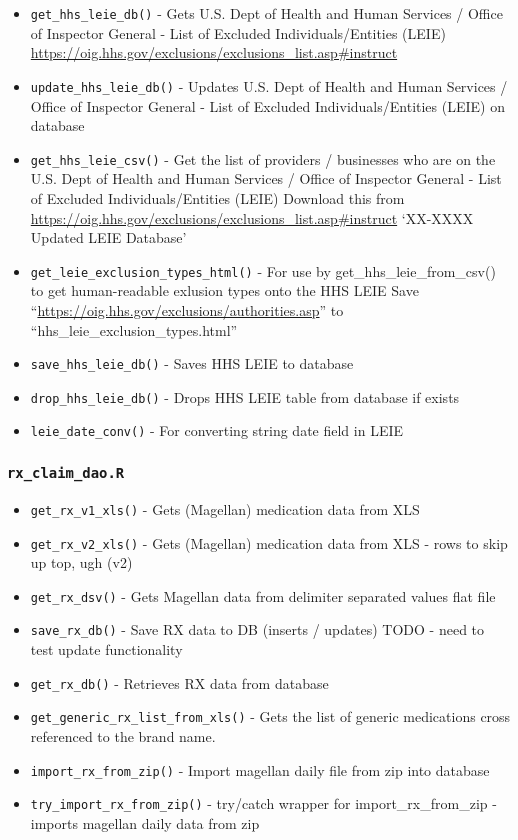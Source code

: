 \documentclass[
]{book}
\providecommand{\tightlist}{%
  \setlength{\itemsep}{0pt}\setlength{\parskip}{0pt}}
\begin{document}
\begin{itemize}
\tightlist
\item
  \texttt{get\_hhs\_leie\_db()} - Gets U.S. Dept of Health and Human Services / Office of Inspector General - List of Excluded Individuals/Entities (LEIE) \url{https://oig.hhs.gov/exclusions/exclusions_list.asp\#instruct}
\item
  \texttt{update\_hhs\_leie\_db()} - Updates U.S. Dept of Health and Human Services / Office of Inspector General - List of Excluded Individuals/Entities (LEIE) on database
\item
  \texttt{get\_hhs\_leie\_csv()} - Get the list of providers / businesses who are on the U.S. Dept of Health and Human Services / Office of Inspector General - List of Excluded Individuals/Entities (LEIE) Download this from \url{https://oig.hhs.gov/exclusions/exclusions_list.asp\#instruct} `XX-XXXX Updated LEIE Database'
\item
  \texttt{get\_leie\_exclusion\_types\_html()} - For use by get\_hhs\_leie\_from\_csv() to get human-readable exlusion types onto the HHS LEIE Save ``\url{https://oig.hhs.gov/exclusions/authorities.asp}'' to ``hhs\_leie\_exclusion\_types.html''
\item
  \texttt{save\_hhs\_leie\_db()} - Saves HHS LEIE to database
\item
  \texttt{drop\_hhs\_leie\_db()} - Drops HHS LEIE table from database if exists
\item
  \texttt{leie\_date\_conv()} - For converting string date field in LEIE
\end{itemize}

\hypertarget{rx_claim_dao.r}{%
\subsubsection{\texorpdfstring{\texttt{rx\_claim\_dao.R}}{rx\_claim\_dao.R}}\label{rx_claim_dao.r}}

\begin{itemize}
\tightlist
\item
  \texttt{get\_rx\_v1\_xls()} - Gets (Magellan) medication data from XLS
\item
  \texttt{get\_rx\_v2\_xls()} - Gets (Magellan) medication data from XLS - rows to skip up top, ugh (v2)
\item
  \texttt{get\_rx\_dsv()} - Gets Magellan data from delimiter separated values flat file
\item
  \texttt{save\_rx\_db()} - Save RX data to DB (inserts / updates) TODO - need to test update functionality
\item
  \texttt{get\_rx\_db()} - Retrieves RX data from database
\item
  \texttt{get\_generic\_rx\_list\_from\_xls()} - Gets the list of generic medications cross referenced to the brand name.
\item
  \texttt{import\_rx\_from\_zip()} - Import magellan daily file from zip into database
\item
  \texttt{try\_import\_rx\_from\_zip()} - try/catch wrapper for import\_rx\_from\_zip - imports magellan daily data from zip
\end{itemize}
\end{document}
